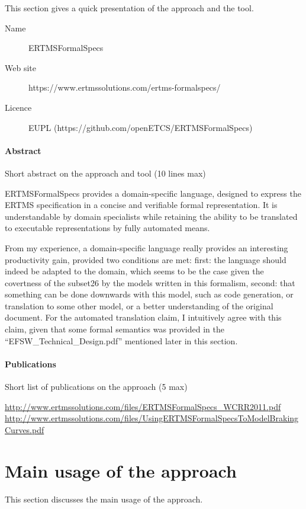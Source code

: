This section gives a quick presentation of the approach and the tool.

\begin{description}
\item[Name] ERTMSFormalSpecs
\item[Web site] https://www.ertmssolutions.com/ertms-formalspecs/
\item[Licence] EUPL (https://github.com/openETCS/ERTMSFormalSpecs)
\end{description}

\paragraph{Abstract} Short abstract on the approach and tool (10 lines max)

ERTMSFormalSpecs provides a domain-specific language, designed to express the ERTMS specification in a concise and verifiable formal representation. It is understandable by domain specialists while retaining the ability to be translated to executable representations by fully automated means.

\begin{assessor1}
From my experience, a domain-specific language really provides an interesting productivity gain, provided two conditions are met: first: the language should indeed be adapted to the domain, which seems to be the case given the covertness of the subset26 by the models written in this formalism, second: that something can be done downwards with this model, such as code generation, or translation to some other model, or a better understanding of the original document. 
For the automated translation claim, I intuitively agree with this claim, given that some formal semantics was provided in the "`EFSW\_Technical\_Design.pdf"' mentioned later in this section. 
\end{assessor1}

\paragraph{Publications} Short list of publications on the approach (5 max)

\url{http://www.ertmssolutions.com/files/ERTMSFormalSpecs\_WCRR2011.pdf   }
\url{http://www.ertmssolutions.com/files/UsingERTMSFormalSpecsToModelBrakingCurves.pdf}

\section{Main usage of the approach}
\label{main_usage}
This section discusses the main usage of the approach.

